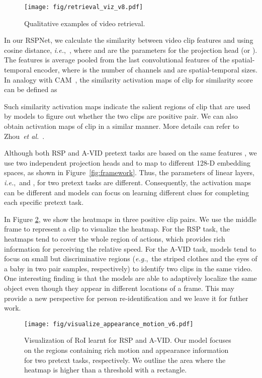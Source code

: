 \documentclass[final]{cvpr}
\def\etal{{\em et al.\/}\, }
\def\ie{\mbox{\textit{i.e.}, }}
\def\eg{\mbox{\textit{e.g.}, }}
\begin{document}
\begin{figure}[t]
	\centering
	\texttt{[image: fig/retrieval\_viz\_v8.pdf]}
	\caption{Qualitative examples of video retrieval.}
	\label{fig:retrieval_viz}
\end{figure}


In our RSPNet, we calculate the similarity  between video clip features  and  using cosine distance, \ie , where  and  are the parameters for the projection head  (or ). The features  is average pooled from the last convolutional features  of the spatial-temporal encoder, where  is the number of channels and  are spatial-temporal sizes. 
In analogy with CAM~\cite{zhou2016learning}, the similarity activation maps  of clip  for similarity score  can be defined as

Such similarity activation maps indicate the salient regions of clip  that are used by models to figure out whether the two clips are positive pair. We can also obtain activation maps of clip  in a similar manner. More details can refer to Zhou~\etal\cite{zhou2016learning}.

Although both RSP and A-VID pretext tasks are based on the same features , we use two independent projection heads  and  to map  to different 128-D embedding spaces, as shown in Figure~\ref{fig:framework}. Thus, the parameters of linear layers, \ie  and , for two pretext tasks are different. Consequently, the activation maps can be different and models can focus on learning different clues for completing each specific pretext task.

In Figure \ref{fig:vis_app_motion}, we show the heatmaps in three positive clip pairs. We use the middle frame to represent a clip to visualize the heatmap. 
For the RSP task, the heatmaps tend to cover the whole region of actions, which provides rich information for perceiving the relative speed.
For the A-VID task, models tend to focus on small but discriminative regions (\eg the striped clothes and the eyes of a  baby in two pair samples, respectively) to identify two clips in the same video. One interesting finding is that the models are able to adaptively localize the same object even though they appear in different locations of a frame. This may provide a new perspective for person re-identification and we leave it for futher work.





\begin{figure}[]
	\centering
	\texttt{[image: fig/visualize\_appearance\_motion\_v6.pdf]}
	\caption{Visualization of RoI learnt for RSP and A-VID.
		Our model focuses on the regions containing rich motion and appearance information for two pretext tasks, respectively. 
		We outline the area where the heatmap is higher than a threshold with a rectangle.
	}
	\label{fig:vis_app_motion}
\end{figure}
\end{document}

